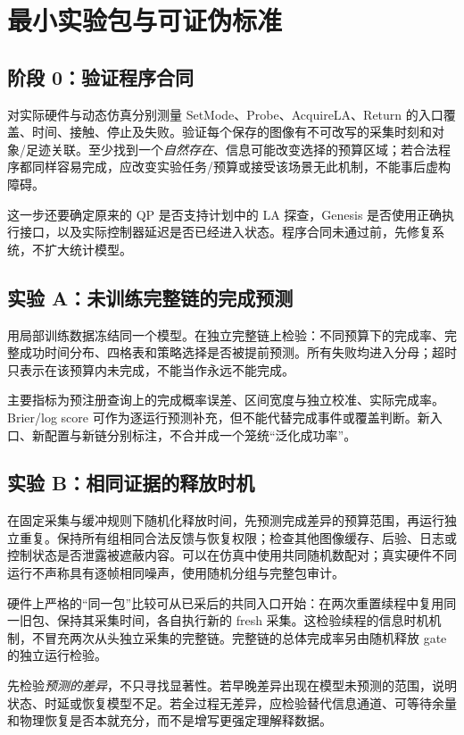 \documentclass[11pt,a4paper,fontset=fandol]{ctexart}
\theoremstyle{definition}\newtheorem{definition}[theorem]{定义}
\theoremstyle{remark}\newtheorem{remark}[theorem]{说明}
\numberwithin{equation}{section}
\begin{document}
\section{最小实验包与可证伪标准}
\label{sec:experiments}
\subsection{阶段 0：验证程序合同}
对实际硬件与动态仿真分别测量 SetMode、Probe、AcquireLA、Return 的入口覆盖、时间、接触、停止及失败。验证每个保存的图像有不可改写的采集时刻和对象/足迹关联。至少找到一个\emph{自然存在}、信息可能改变选择的预算区域；若合法程序都同样容易完成，应改变实验任务/预算或接受该场景无此机制，不能事后虚构障碍。

这一步还要确定原来的 QP 是否支持计划中的 LA 探查，Genesis 是否使用正确执行接口，以及实际控制器延迟是否已经进入状态。程序合同未通过前，先修复系统，不扩大统计模型。

\subsection{实验 A：未训练完整链的完成预测}
用局部训练数据冻结同一个模型。在独立完整链上检验：不同预算下的完成率、完整成功时间分布、四格表和策略选择是否被提前预测。所有失败均进入分母；超时只表示在该预算内未完成，不能当作永远不能完成。

主要指标为预注册查询上的完成概率误差、区间宽度与独立校准、实际完成率。Brier/log score 可作为逐运行预测补充，但不能代替完成事件或覆盖判断。新入口、新配置与新链分别标注，不合并成一个笼统“泛化成功率”。

\subsection{实验 B：相同证据的释放时机}
在固定采集与缓冲规则下随机化释放时间，先预测完成差异的预算范围，再运行独立重复。保持所有组相同合法反馈与恢复权限；检查其他图像缓存、后验、日志或控制状态是否泄露被遮蔽内容。可以在仿真中使用共同随机数配对；真实硬件不同运行不声称具有逐帧相同噪声，使用随机分组与完整包审计。

硬件上严格的“同一包”比较可从已采后的共同入口开始：在两次重置续程中复用同一旧包、保持其采集时间，各自执行新的 fresh 采集。这检验续程的信息时机机制，不冒充两次从头独立采集的完整链。完整链的总体完成率另由随机释放 gate 的独立运行检验。

先检验\emph{预测的差异}，不只寻找显著性。若早晚差异出现在模型未预测的范围，说明状态、时延或恢复模型不足。若全过程无差异，应检验替代信息通道、可等待余量和物理恢复是否本就充分，而不是增写更强定理解释数据。
\end{document}
